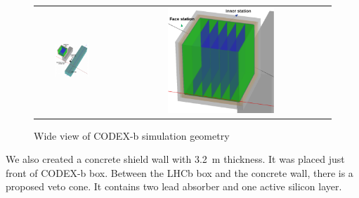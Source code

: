
\begin{figure}[h]
\begin{center}
  \begin{tabular}[t]{cc}
    \includegraphics[width=0.5\textwidth]{figs/INT/CODEXbBigGeo.pdf} &
    \includegraphics[width=0.5\textwidth]{figs/INT/ZoomVersion.pdf}
  \end{tabular}
\end{center}
\caption{
    Wide view of CODEX-b simulation geometry
}
\end{figure}

We also created a concrete shield wall with 3.2~m thickness.
It was placed just front of CODEX-b box.
Between the LHCb box and the concrete wall, there is a proposed veto cone.
It contains two lead absorber and one active silicon layer.

